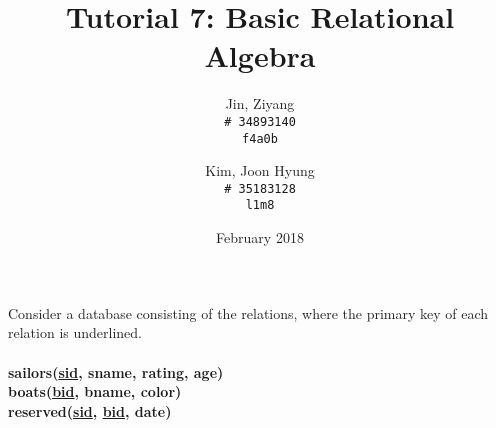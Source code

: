 \documentclass{article}
\title{Tutorial 7: Basic Relational Algebra}
\author{
	Jin, Ziyang\\
	\texttt{\# 34893140}\\
	\texttt{f4a0b}
	\and
	Kim, Joon Hyung\\
	\texttt{\# 35183128}\\
	\texttt{l1m8}
}
\date{February 2018}
\begin{document}
	\maketitle

\noindent Consider a database consisting of the relations, where the primary key of each relation is
underlined.\\
\\
\textbf{sailors(\underline{sid}, sname, rating, age)}\\
\textbf{boats(\underline{bid}, bname, color)}\\
\textbf{reserved(\underline{sid}, \underline{bid}, date)}
\end{document}
